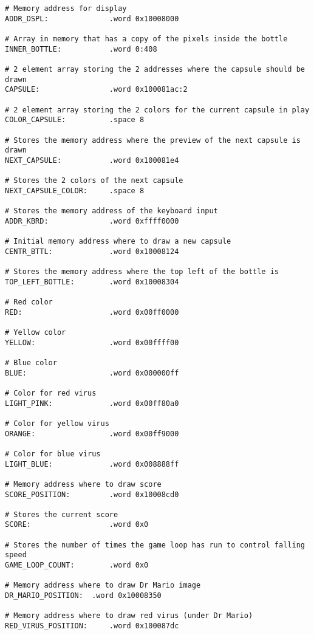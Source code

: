 \documentclass{article}
\begin{document}
\begin{enumerate}
    \begin{verbatim}
# Memory address for display
ADDR_DSPL:              .word 0x10008000        

# Array in memory that has a copy of the pixels inside the bottle
INNER_BOTTLE:           .word 0:408             

# 2 element array storing the 2 addresses where the capsule should be drawn
CAPSULE:                .word 0x100081ac:2      

# 2 element array storing the 2 colors for the current capsule in play
COLOR_CAPSULE:          .space 8                

# Stores the memory address where the preview of the next capsule is drawn
NEXT_CAPSULE:           .word 0x100081e4        

# Stores the 2 colors of the next capsule
NEXT_CAPSULE_COLOR:     .space 8                

# Stores the memory address of the keyboard input
ADDR_KBRD:              .word 0xffff0000        

# Initial memory address where to draw a new capsule
CENTR_BTTL:             .word 0x10008124

# Stores the memory address where the top left of the bottle is
TOP_LEFT_BOTTLE:        .word 0x10008304

# Red color
RED:                    .word 0x00ff0000

# Yellow color
YELLOW:                 .word 0x00ffff00

# Blue color
BLUE:                   .word 0x000000ff

# Color for red virus
LIGHT_PINK:             .word 0x00ff80a0

# Color for yellow virus
ORANGE:                 .word 0x00ff9000

# Color for blue virus
LIGHT_BLUE:             .word 0x008888ff

# Memory address where to draw score
SCORE_POSITION:         .word 0x10008cd0

# Stores the current score
SCORE:                  .word 0x0

# Stores the number of times the game loop has run to control falling speed
GAME_LOOP_COUNT:        .word 0x0

# Memory address where to draw Dr Mario image
DR_MARIO_POSITION:  .word 0x10008350

# Memory address where to draw red virus (under Dr Mario)
RED_VIRUS_POSITION:     .word 0x100087dc


\end{verbatim}
\end{enumerate}
\end{document}
